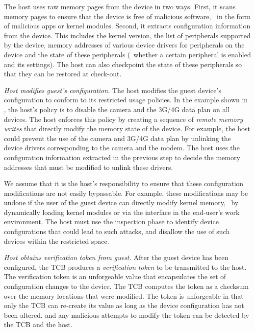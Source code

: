 \begin{mylist}
The host uses raw memory pages from the device in two ways. First, it scans
memory pages to ensure that the device is free of malicious software, \eg~in
the form of malicious apps or kernel modules.  Second, it extracts
configuration information from the device. This includes the kernel version,
the list of peripherals supported by the device, memory addresses of various
device drivers for peripherals on the device and the state of these peripherals
(\eg~whether a certain peripheral is enabled and its settings). The host can
also checkpoint the state of these peripherals so that they can be restored at
check-out. 

\item \textit{Host modifies guest's configuration.} The host modifies the guest
device's configuration to conform to its restricted usage policies.  In the
example shown in , the host's policy is to
disable the camera and the 3G/4G data plan on all devices. The host enforces
this policy by creating a sequence of \textit{remote memory writes} that
directly modify the memory state of the device. For example, the host could
prevent the use of the camera and 3G/4G data plan by unlinking the device
drivers corresponding to the camera and the modem. The host uses the
configuration information extracted in the previous step to decide the memory
addresses that must be modified to unlink these drivers. 

We assume that it is the host's responsibility to ensure that these
configuration modifications are not easily bypassable. For example, these
modifications may be undone if the user of the guest device can directly modify
kernel memory, \eg~by dynamically loading kernel modules or via the
 interface in the end-user's work environment.  The host must
use the inspection phase to identify device configurations that could lead to
such attacks, and disallow the use of such devices within the restricted space.

\item \textit{Host obtains verification token from guest.} After the guest
device has been configured, the TCB produces a \textit{verification token} to
be transmitted to the host. The verification token is an unforgeable value that
encapsulates the set of configuration changes to the device. The TCB computes
the token as a checksum over the memory locations that were modified.  The
token is unforgeable in that only the TCB can re-create its value as long as
the device configuration has not been altered, and any malicious attempts to
modify the token can be detected by the TCB and the host.


\end{mylist}
